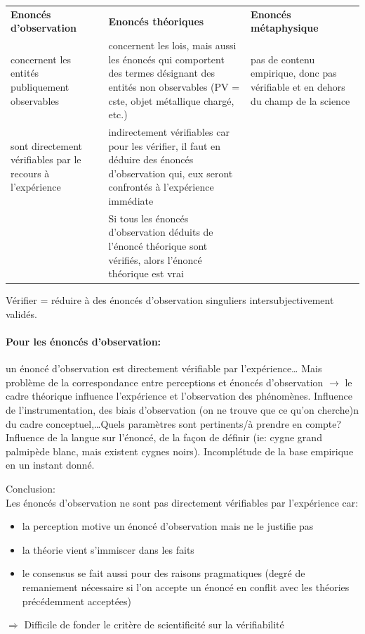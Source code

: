 \documentclass{report}
\begin{document}
	\begin{center}
		\begin{tabular}{|p{}|p{}|p{}|}
			\hline \textbf{Enoncés d’observation} & \textbf{Enoncés théoriques} & \textbf{Enoncés métaphysique}\\
			\hhline{|=|=|=|} concernent les entités publiquement observables & concernent les lois, mais aussi les énoncés qui comportent des termes désignant des entités non observables (PV = cste, objet métallique chargé, etc.) & pas de contenu empirique, donc pas vérifiable et en dehors du champ de la science\\
			\hline sont directement vérifiables par le recours à l’expérience & indirectement vérifiables car pour les vérifier, il faut en déduire des énoncés d’observation qui, eux seront confrontés à l’expérience immédiate & \\
			\hline  & Si tous les énoncés d’observation déduits de l’énoncé théorique sont vérifiés, alors l’énoncé théorique est vrai & \\
			\hline
		\end{tabular}
	\end{center}
	
	Vérifier = réduire à des énoncés d’observation singuliers intersubjectivement validés.
	
	\paragraph{Pour les énoncés d'observation:} un énoncé d’observation est directement vérifiable par l’expérience… Mais problème de la correspondance entre perceptions et énoncés d’observation $\rightarrow$ le cadre théorique influence l’expérience et l’observation des phénomènes. Influence de l'instrumentation, des biais d'observation (on ne trouve que ce qu'on cherche)n du cadre conceptuel,\dots Quels paramètres sont pertinents/à prendre en compte? Influence de la langue sur l'énoncé, de la façon de définir (ie: cygne grand palmipède blanc, mais existent cygnes noirs). Incomplétude de la base empirique en un instant donné.
	
	Conclusion:\\
	Les énoncés d’observation ne sont pas directement vérifiables par l’expérience car:
	\begin{itemize}
		\item la perception motive un énoncé d’observation mais ne le justifie pas
		\item la théorie vient s’immiscer dans les \og faits \fg
		\item le consensus se fait aussi pour des raisons pragmatiques (degré de remaniement nécessaire si l’on accepte un énoncé en conflit avec les théories précédemment acceptées)
	\end{itemize}
	$\Rightarrow$ Difficile de fonder le critère de scientificité sur la vérifiabilité
	
\end{document}
